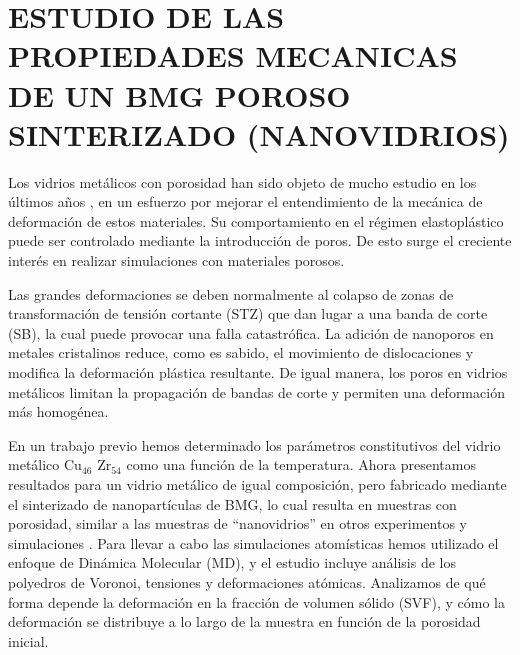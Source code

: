 
\chapter{ESTUDIO DE LAS PROPIEDADES MECANICAS DE UN BMG POROSO SINTERIZADO (NANOVIDRIOS)} %

\label{C5} %


Los vidrios metálicos con porosidad han sido objeto de mucho estudio en los últimos a\~nos \citep{guan13,wang10}, en un esfuerzo
por mejorar el entendimiento de la mecánica de deformación de estos materiales. Su comportamiento en el
régimen elastoplástico puede ser controlado mediante la introducción de poros. De esto surge el creciente
interés en realizar simulaciones con materiales porosos.

Las grandes deformaciones se deben normalmente al colapso de zonas de transformación de tensión cortante (STZ) que dan
lugar a una banda de corte (SB), la cual puede provocar una falla catastrófica. La adición de nanoporos en
metales cristalinos reduce, como es sabido, el movimiento de dislocaciones y modifica la deformación plástica
resultante. De igual manera, los poros en vidrios metálicos limitan la propagación de bandas de corte y permiten
una deformación más homogénea.

En un trabajo previo hemos determinado los parámetros constitutivos del vidrio metálico Cu$_{46}$ Zr$_{54}$ como
una función de la temperatura. Ahora presentamos resultados para un vidrio metálico de igual composición, pero
fabricado mediante el sinterizado de nanopartículas de BMG, lo cual resulta en muestras con porosidad, similar
a las muestras de ``nanovidrios'' en otros experimentos y simulaciones \citep{adibi13,albe13}. Para llevar a cabo las simulaciones atomísticas
hemos utilizado el enfoque de Dinámica Molecular (MD), y el estudio incluye análisis de los polyedros de Voronoi, tensiones
y deformaciones atómicas. Analizamos de qué forma depende la deformación en la fracción de volumen sólido (SVF), y cómo la deformación
se distribuye a lo largo de la muestra en función de la porosidad inicial.



